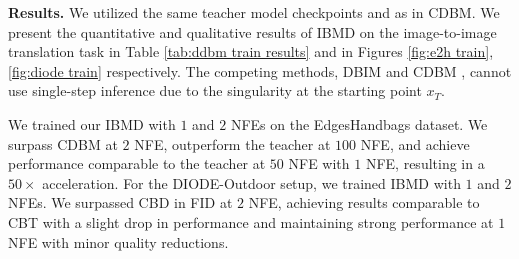 \textbf{Results.} We utilized the same teacher model checkpoints and
as in CDBM. We present the quantitative and qualitative results of IBMD on the image-to-image translation task in Table \ref{tab:ddbm train results} and in Figures \ref{fig:e2h train}, \ref{fig:diode train} respectively. 
The competing methods, DBIM \citep[Section 4.1]{zhou2024denoising} and CDBM \citep[Section 3.4]{he2024consistency}, cannot use single-step inference due to the singularity at the starting point $x_T$. 


We trained our IBMD with $1$ and $2$ NFEs on the Edges\textrightarrow Handbags dataset. We surpass CDBM at $2$ NFE, outperform the teacher at $100$ NFE, and achieve performance comparable to the teacher at $50$ NFE with $1$ NFE, resulting in a $50\times$ acceleration.
For the DIODE-Outdoor setup, we trained IBMD with $1$ and $2$ NFEs. We surpassed CBD in FID at $2$ NFE, achieving results comparable to CBT with a slight drop in performance and maintaining strong performance at $1$ NFE with minor quality reductions.

